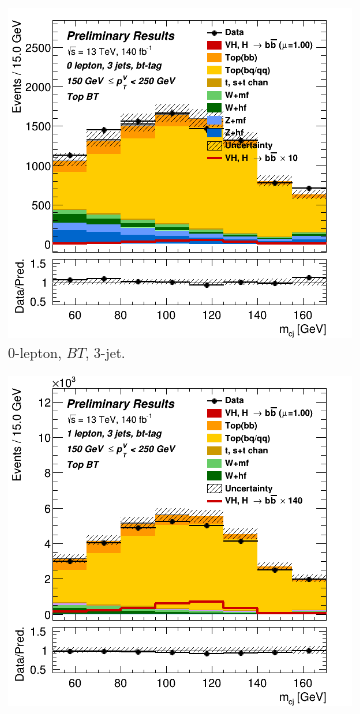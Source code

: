 \begin{figure}[h!]
  \centering
  \begin{subfigure}[b]{0.32\textwidth}
      \centering
      \includegraphics[width=\textwidth]{Images/VH/Own_fit/prefit_VHcc/Region_distmBB_BMax250_BMin150_DtopCRBC_J3_TTypebt_T1_L0_Y6051_Prefit.png}
      \caption{0-lepton, $BT$, 3-jet.}
      \label{fig:plots_VHcc_ex_OL_TopCR}
  \end{subfigure}
  \begin{subfigure}[b]{0.32\textwidth}
      \centering
      \includegraphics[width=\textwidth]{Images/VH/Own_fit/prefit_VHcc/Region_distmBB_BMax250_BMin150_DtopCRBC_J3_TTypebt_T1_L1_Y6051_Prefit.png}

\end{subfigure}
\end{figure}
